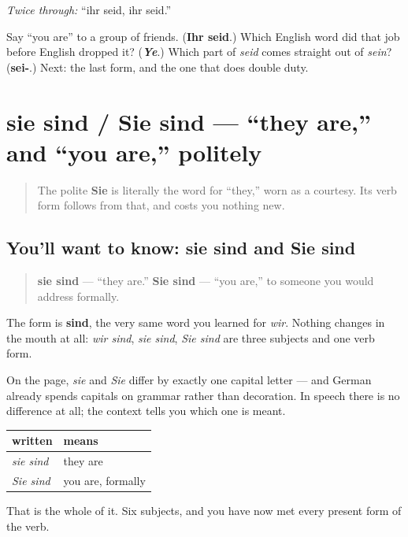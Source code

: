 \emph{Twice through:} \textquotedblleft{}ihr seid, ihr seid.\textquotedblright{}

\begin{tcolorbox}[breakable,colback=teal!4,colframe=teal!35!black,title={Before you move on}]
Say \textquotedblleft{}you are\textquotedblright{} to a group of friends. (\textbf{Ihr seid}.) Which English word did that job before English dropped it? (\emph{\textbf{Ye}}.) Which part of \emph{seid} comes straight out of \emph{sein}? (\textbf{sei-}.) Next: the last form, and the one that does double duty.
\end{tcolorbox}
\section[sie sind / Sie sind]{sie sind / Sie sind — \textquotedblleft{}they are,\textquotedblright{} and \textquotedblleft{}you are,\textquotedblright{} politely}

\label{lesson:GE-C16-sie-sind}



\begin{quote}
The polite \textbf{Sie} is literally the word for \textquotedblleft{}they,\textquotedblright{} worn as a courtesy. Its verb form follows from that, and costs you nothing new.
\end{quote}

\subsection*{You'll want to know: sie sind and Sie sind}
\begin{quote}
\textbf{sie sind} — \textquotedblleft{}they are.\textquotedblright{} \textbf{Sie sind} — \textquotedblleft{}you are,\textquotedblright{} to someone you would address formally.
\end{quote}

The form is \textbf{sind}, the very same word you learned for \emph{wir}. Nothing changes in the mouth at all: \emph{wir sind}, \emph{sie sind}, \emph{Sie sind} are three subjects and one verb form.

\begin{grammarlens}[title={Grammar Lens: the capital carries the politeness}]
On the page, \emph{sie} and \emph{Sie} differ by exactly one capital letter — and German already spends capitals on grammar rather than decoration. In speech there is no difference at all; the context tells you which one is meant.

\noindent
\begin{tabularx}{\linewidth}{@{}>{\raggedright\arraybackslash}X>{\raggedright\arraybackslash}X@{}}
\toprule
\textbf{written} & \textbf{means} \\
\midrule
\emph{sie sind} & they are \\
\emph{Sie sind} & you are, formally \\
\bottomrule
\end{tabularx}

That is the whole of it. Six subjects, and you have now met every present form of the verb.
\end{grammarlens}

